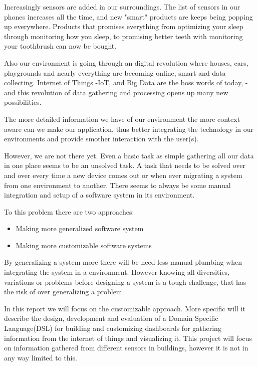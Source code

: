Increasingly sensors are added in our surroundings. 
The list of sensors in our phones increases all the time, and new "smart" products are keeps being popping up everywhere.
Products that promises everything from optimizing your sleep through monitoring how you sleep\cite{wareable}, to promising better teeth with monitoring your toothbrush\cite{toothbrush} can now be bought.

Also our environment is going through an digital revolution where houses, cars, playgrounds and nearly everything are becoming online, smart and data collecting.
Internet of Things -IoT, and Big Data are the boss words of today, -and this revolution of data gathering and processing opens up many new possibilities.

The more detailed information we have of our environment the more context aware can we make our application, thus better integrating the technology in our environments and provide smother interaction with the user(s).

However, we are not there yet. 
Even a basic task as simple gathering all our data in one place seems to be an unsolved task.
A task that needs to be solved over and over every time a new device comes out or when ever migrating a system from one environment to another. 
There seems to always be some manual integration and setup of a software system in its environment.

To this problem there are two approaches:
\begin{itemize}
\item Making more generalized software system
\item Making more customizable software systems
\end{itemize}

By generalizing a system more there will be need less manual plumbing when integrating the system in a environment. 
However knowing all diversities, variations or problems before designing a system is a tough challenge, that has the risk of over generalizing a problem.

In this report we will focus on the customizable approach.
More specific will it describe the design, development and evaluation of a Domain Specific Language(DSL) for building and customizing dashboards for gathering information from the internet of things and visualizing it. 
This project will focus on information gathered from different sensors in buildings, however it is not in any way limited to this.

